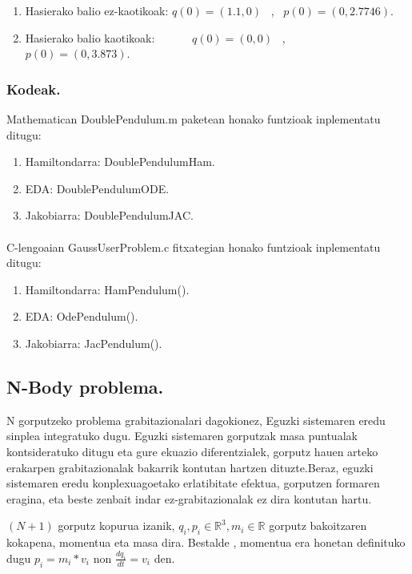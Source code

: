 \begin{enumerate}
   \item Hasierako balio ez-kaotikoak:   
   $q(0)=(1.1, 0)$ \ , \ $p(0)=(0,2.7746)$.
    
   \item Hasierako balio kaotikoak: \ \ \ \ \ \   
   $q(0)=(0,0)$ \ , \ \ \ \ $p(0)=(0,3.873)$.
\end{enumerate}


\subsubsection{Kodeak.}

Mathematican DoublePendulum.m paketean honako funtzioak inplementatu ditugu:

\begin{enumerate}
   \item Hamiltondarra: DoublePendulumHam.
   \item EDA: DoublePendulumODE.
   \item Jakobiarra: DoublePendulumJAC.
\end{enumerate}

\paragraph*{}C-lengoaian GaussUserProblem.c fitxategian honako funtzioak inplementatu ditugu:

\begin{enumerate}
   \item Hamiltondarra: HamPendulum().
   \item EDA: OdePendulum().
   \item Jakobiarra: JacPendulum().
\end{enumerate}

\subsection{N-Body problema.}

N gorputzeko problema grabitazionalari dagokionez, Eguzki sistemaren eredu sinplea integratuko dugu. Eguzki sistemaren gorputzak masa puntualak kontsideratuko ditugu eta gure ekuazio diferentzialek, gorputz hauen arteko erakarpen grabitazionalak bakarrik kontutan hartzen dituzte.Beraz, eguzki sistemaren eredu konplexuagoetako erlatibitate efektua, gorputzen formaren eragina, eta beste zenbait indar ez-grabitazionalak ez dira kontutan hartu.

$(N+1)$ gorputz kopurua izanik, $q_i,p_i\in \mathbb{R}^3, m_i \in \mathbb{R}$ gorputz bakoitzaren kokapena, momentua eta masa dira. Bestalde , momentua era honetan definituko dugu $p_i=m_i*v_i$ non $\frac{d q_i}{dt}=v_i$ den.



